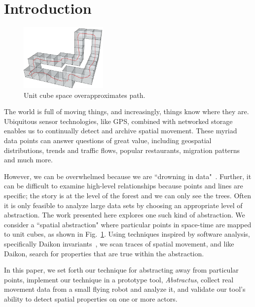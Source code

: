 \section{Introduction}

\begin{figure}
  \vspace{-0.4cm}
  \centering
  \includegraphics[width=0.38\textwidth]{./figures/path_overview}
  \caption{Unit cube space overapproximates path.}
  \label{fig:unitCubes}
\end{figure}

The world is full of moving things, and increasingly, things know where they are. 
Ubiquitous sensor technologies, like GPS, combined with networked storage enables us to continually detect and archive spatial movement.
These myriad data points can answer questions of great value, including geospatial distributions, trends and traffic flows, popular restaurants, migration patterns and much more.


However, we can be overwhelmed because we are ``drowning in data"~\cite{morse1993drowning}.
Further, it can be difficult to examine high-level relationships because points and lines are specific; the story is at the level of the forest and we can only see the trees.  
Often it is only feasible to analyze large data sets by choosing an appropriate level of abstraction.
The work presented here explores one such kind of abstraction.
We consider a ``spatial abstraction" where particular points in space-time are mapped to unit cubes, as shown in Fig.~\ref{fig:unitCubes}.
Using techniques inspired by software analysis, specifically Daikon invariants~\cite{kataoka2001automated}, we scan traces of spatial movement, and like Daikon, search for properties that are true within the abstraction.  

In this paper, we set forth our technique for abstracting away from particular points, 
implement our technique in a prototype tool, \emph{Abstractus},
collect real movement data from a small flying robot and analyze it, 
and validate our tool's ability to detect spatial properties on one or more actors.


